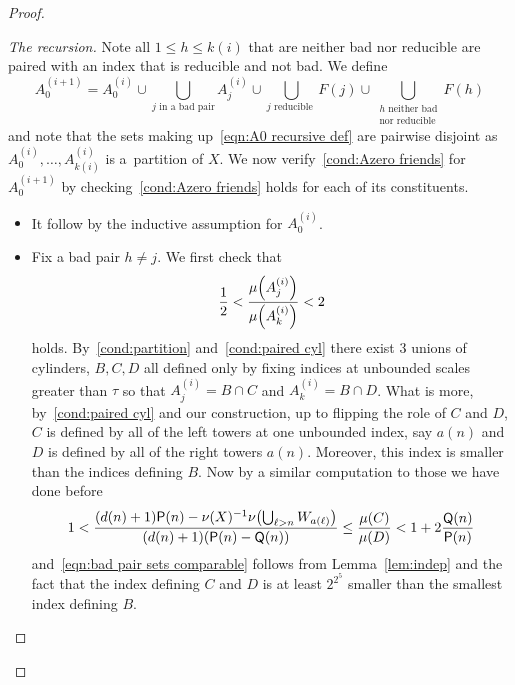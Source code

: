 \documentclass[AHL,Unicode,longabstracts,published]{cedram}
\DeclareMathOperator{\Q}{\mathsf{Q}}
\renewcommand{\P}{\mathsf{P}}
\let\originalleft\left
\let\originalright\right
\renewcommand{\left}{\mathopen{}\mathclose\bgroup\originalleft}
\renewcommand{\right}{\aftergroup\egroup\originalright}
\begin{document}
\begin{proof}
\begin{proof}[{The recursion}]
Note all $1 \le h \le k(i)$ that are neither bad nor reducible are paired with an index that is reducible and not bad. We define
\begin{equation}\label{eqn:A0 recursive def}
A_0^{(i+1)} = A_0^{(i)}
\cup
\bigcup_{j \text{ in a bad pair}} A_j^{(i)}
\cup
\bigcup_{j \text{ reducible }} F(j)
\cup
\bigcup_{\substack{h\text{ neither bad}\\\text{nor reducible}}} F(h)
\end{equation}
and note that the sets making up~\eqref{eqn:A0 recursive def} are pairwise disjoint as $A^{(i)}_0,\dots,A^{(i)}_{k(i)}$ is a~partition of $X$. We now verify~\eqref{cond:Azero friends} for $A^{(i+1)}_0$ by checking~\eqref{cond:Azero friends} holds for each of its constituents.
\begin{itemize}
\item It follow by the inductive assumption for $A_0^{(i)}$.
\item Fix a bad pair $h \ne j$. We first check that
\begin{equation}\label{eqn:bad pair sets comparable}
\frac{1}{2} < \frac{\mu\left(A^{(i)}_j\right)}{\mu\left(A^{(i)}_k\right)} < 2
\end{equation}
holds. By~\eqref{cond:partition} and~\eqref{cond:paired cyl} there exist 3 unions of cylinders, $B,C,D$ all defined only by fixing indices at unbounded scales greater than $\tau$ so that $A_j^{(i)}=B \cap C$ and $A_k^{(i)}=B \cap D$. What is more, by~\eqref{cond:paired cyl} and our construction, up to flipping the role of $C$ and $D$, $C$ is defined by all of the left towers at one unbounded index, say $a(n)$ and $D$ is defined by all of the right towers $a(n)$. Moreover, this index is smaller than the indices defining $B$. Now by a similar computation to those we have done before
\[
1 < \frac{(d(n)+1)\P(n)-\nu(X)^{-1}\nu\left(\bigcup_{\ell>n}W_{a(\ell)}\right)}{(d(n)+1)(\P(n)-\Q(n))}\leq \frac{\mu(C)}{\mu(D)}<1+2\frac{\Q(n)}{\P(n)}
\]
and~\eqref{eqn:bad pair sets comparable} follows from Lemma~\ref{lem:indep} and the fact that the index defining $C$ and $D$ is at least $2^{2^5}$ smaller than the smallest index defining $B$.


\end{itemize}
\end{proof}
\end{proof}
\end{document}
